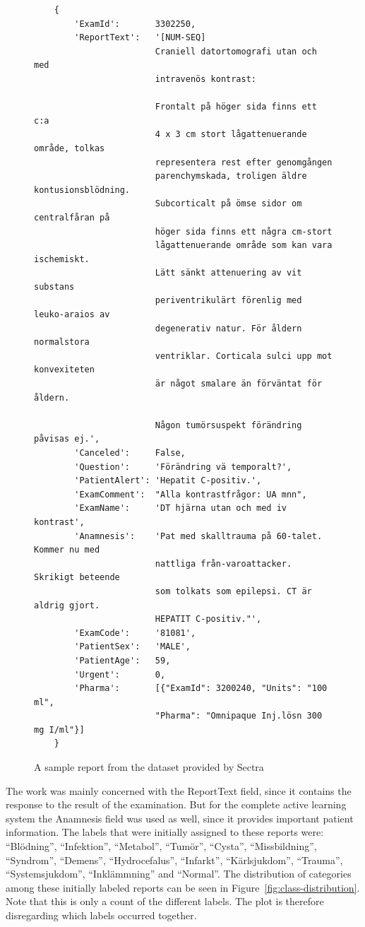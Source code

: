 \begin{figure}
\begin{verbatim}
    {
        'ExamId':       3302250, 
        'ReportText':   '[NUM-SEQ] 
                        Craniell datortomografi utan och med 
                        intravenös kontrast:
                        
                        Frontalt på höger sida finns ett c:a 
                        4 x 3 cm stort lågattenuerande område, tolkas 
                        representera rest efter genomgången 
                        parenchymskada, troligen äldre kontusionsblödning. 
                        Subcorticalt på ömse sidor om centralfåran på 
                        höger sida finns ett några cm-stort 
                        lågattenuerande område som kan vara ischemiskt. 
                        Lätt sänkt attenuering av vit substans 
                        periventrikulärt förenlig med leuko-araios av 
                        degenerativ natur. För åldern normalstora 
                        ventriklar. Corticala sulci upp mot konvexiteten 
                        är något smalare än förväntat för åldern. 
                        
                        Någon tumörsuspekt förändring påvisas ej.',
        'Canceled':     False, 
        'Question':     'Förändring vä temporalt?',
        'PatientAlert': 'Hepatit C-positiv.', 
        'ExamComment':  "Alla kontrastfrågor: UA mnn", 
        'ExamName':     'DT hjärna utan och med iv kontrast',
        'Anamnesis':    'Pat med skalltrauma på 60-talet. Kommer nu med 
                        nattliga från-varoattacker. Skrikigt beteende 
                        som tolkats som epilepsi. CT är aldrig gjort. 
                        HEPATIT C-positiv."',
        'ExamCode':     '81081', 
        'PatientSex':   'MALE', 
        'PatientAge':   59, 
        'Urgent':       0, 
        'Pharma':       [{"ExamId": 3200240, "Units": "100 ml", 
                        "Pharma": "Omnipaque Inj.lösn 300 mg I/ml"}]
    }
\end{verbatim}
\caption{A sample report from the dataset provided by Sectra}
\label{fig:sample-report}
\end{figure}

The work was mainly concerned with the ReportText field, since it contains the response to the result of the examination.
But for the complete active learning system the Anamnesis field was used as well, since it provides important patient information.
The labels that were initially assigned to these reports were:
``Blödning'', ``Infektion'', ``Metabol'', ``Tumör'', ``Cysta'', ``Missbildning'', ``Syndrom'', ``Demens'', ``Hydrocefalus'', ``Infarkt'', ``Kärlsjukdom'', ``Trauma'', ``Systemsjukdom'', ``Inklämmning'' and ``Normal''.
The distribution of categories among these initially labeled reports can be seen in Figure~\ref{fig:class-distribution}.
Note that this is only a count of the different labels.
The plot is therefore disregarding which labels occurred together.

